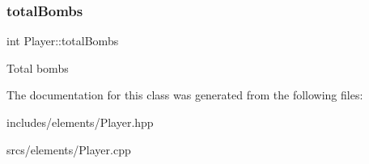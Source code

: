 \subsubsection{\texorpdfstring{total\+Bombs}{totalBombs}}
{\footnotesize\ttfamily int Player\+::total\+Bombs}

Total bombs 

The documentation for this class was generated from the following files\+:\begin{DoxyCompactItemize}
\item 
includes/elements/Player.\+hpp\item 
srcs/elements/Player.\+cpp\end{DoxyCompactItemize}
